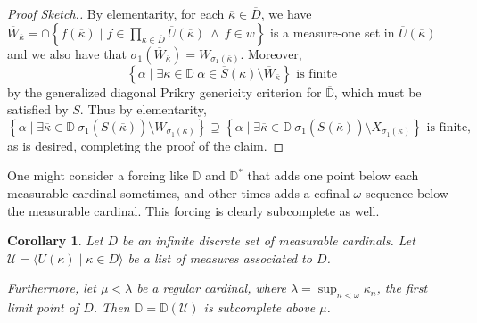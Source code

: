 \documentclass{amsart}
\newtheorem{corollary}[theorem]{Corollary}
\theoremstyle{definition}
\theoremstyle{remark}
\newcommand{\D}{\mathbb{D}}
\renewcommand{\S}{{\overline{S}}}
\newcommand{\U}{\mathcal{U}}
\newcommand{\st}{\; | \;}
\newcommand{\set}[2]{\left\{#1\st #2 \right\}}
\newcommand{\seq}[2]{\langle #1 \st #2 \rangle}
\begin{document}
\begin{proof}[Proof Sketch.]
By elementarity, for each $\overline \kappa \in \overline D$, we have $\overline W_{\overline \kappa} = \cap \set{f(\overline \kappa) }{ f \in \prod_{\overline \kappa \in \overline D} \overline U(\overline \kappa) \ \land \ f \in w }$ is a measure-one set in $\overline U(\overline \kappa)$ and we also have that $\sigma_1(\overline W_{\overline \kappa}) = W_{\sigma_1(\overline \kappa)}$. Moreover, 
$$\set{ \alpha }{ \exists \overline \kappa \in \D \ \alpha \in \overline S(\overline \kappa) \setminus \overline W_{\overline \kappa} } \text{ is finite}$$ by the generalized diagonal Prikry genericity criterion for $\overline{\D}$, which must be satisfied by $\overline S$.
Thus by elementarity,
$$\set{ \alpha }{ \exists \overline \kappa \in \D \ \sigma_1(\S(\overline \kappa)) \setminus W_{\sigma_1(\overline \kappa)} } \supseteq \set{ \alpha }{ \exists \overline \kappa \in \D \ \sigma_1(\S(\overline \kappa)) \setminus X_{\sigma_1(\overline \kappa)}} \text{ is finite,}$$
as is desired, completing the proof of the claim. 
\end{proof}

One might consider a forcing like $\D$ and $\D^*$ that adds one point below each measurable cardinal sometimes, and other times adds a cofinal $\omega$-sequence below the measurable cardinal. This forcing is clearly subcomplete as well.
%

\begin{corollary} Let $D$ be an infinite discrete set of measurable cardinals. Let $\U = \seq{ U(\kappa) }{ \kappa \in D }$ be a list of measures associated to $D$. 

Furthermore, let $\mu < \lambda$ be a regular cardinal, where $\lambda = \sup_{n<\omega} \kappa_n$, the first limit point of $D$.
Then $\D=\D(\U)$ is subcomplete above $\mu$. \end{corollary}
\end{document}
